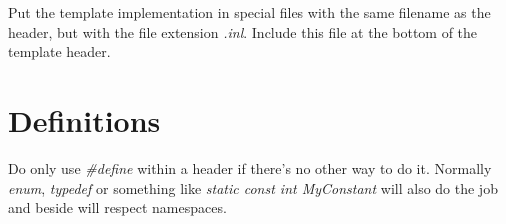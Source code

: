 Put the template implementation in special files with the same filename as the header, but with the file extension \emph{.inl}. Include this file at the bottom of the template header.




\section{Definitions}
Do only use \emph{\#define} within a header if there's no other way to do it. Normally \emph{enum}, \emph{typedef} or something like \emph{static const int MyConstant} will also do the job and beside will respect namespaces.
